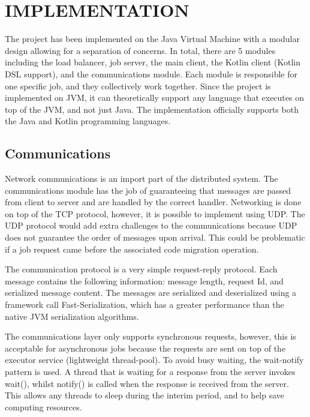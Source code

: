 \section{IMPLEMENTATION}\label{sec:impl}

The project has been implemented on the Java Virtual Machine with a modular design allowing for
a separation of concerns.
In total, there are 5 modules including the load balancer, job server, the main client,
the Kotlin client (Kotlin DSL support), and the communications module.
Each module is responsible for one specific job, and they collectively work together.
Since the project is implemented on JVM, it can theoretically support any language
that executes on top of the JVM, and not just Java.
The implementation officially supports both the Java and Kotlin programming languages.

\subsection{Communications}\label{subsec:communcations}

Network communications is an import part of the distributed system.
The communications module has the job of guaranteeing that messages
are passed from client to server and are handled by the correct handler.
Networking is done on top of the TCP protocol, however, it is possible to
implement using UDP.
The UDP protocol would add extra challenges to the communications because
UDP does not guarantee the order of messages upon arrival.
This could be problematic if a job request came before the associated
code migration operation.

The communication protocol is a very simple request-reply protocol.
Each message contains the following information:
message length, request Id, and serialized message content.
The messages are serialized and deserialized using a framework call Fast-Serialization,
which has a greater performance than the native JVM serialization algorithms.

The communications layer only supports synchronous requests, however, this is acceptable
for asynchronous jobs because the requests are sent on top of the executor service (lightweight thread-pool).
To avoid busy waiting, the wait-notify pattern is used.
A thread that is waiting for a response from the server invokes wait(),
whilst notify() is called when the response is received from the server.
This allows any threads to sleep during the interim period, and to help
save computing resources.

